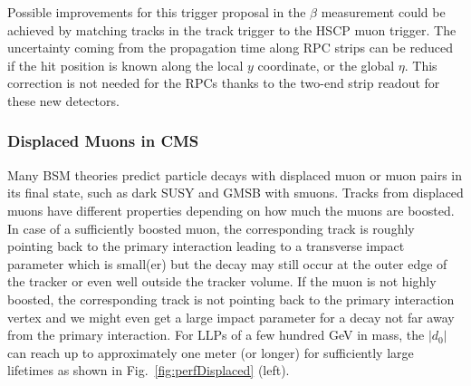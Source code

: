 Possible improvements for this trigger proposal in the $\beta$ measurement could be achieved by matching tracks in the track trigger to the HSCP muon trigger. The uncertainty coming from the propagation time along RPC strips can be reduced if the hit position is known along the local $y$ coordinate, or the global $\eta$. This correction is not needed for the RPCs thanks to the two-end strip readout for these new detectors.

\subsubsection{Displaced Muons in CMS} 

Many BSM theories predict particle decays with displaced muon or muon pairs in its final state, such as dark SUSY and GMSB with smuons. 
Tracks from displaced muons have different properties depending on how much the muons are boosted. 
In case of a sufficiently boosted muon, the corresponding track is roughly pointing back to the primary interaction leading to a transverse impact parameter which is small(er) but the decay may still occur at the outer edge of the tracker or even well outside the tracker volume.
If the muon is not highly boosted, the corresponding track is not pointing back to the primary interaction vertex and we might even get a large impact parameter for a decay not far away from the primary interaction.
For LLPs of a few hundred GeV in mass, the $|d_0|$ can
reach up to approximately one meter (or longer) for sufficiently large
lifetimes as shown in Fig.~\ref{fig:perfDisplaced} (left).

